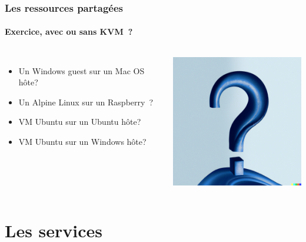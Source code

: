 \documentclass{beamer}
\begin{document}
    \begin{frame}
        \transdissolve
        \frametitle{Les ressources partagées}
        \framesubtitle{Exercice, avec ou sans KVM~?}
        \begin{columns}
            \begin{itemize}
                \item Un Windows guest sur un Mac OS hôte?
                \item Un Alpine Linux sur un Raspberry\footnotemark~?
                \item VM Ubuntu sur un Ubuntu hôte?
                \item VM Ubuntu sur un Windows hôte?
            \end{itemize}
            \centering
            \includegraphics[width=6cm]{image/question-mark-on-a-blank-background}
        \end{columns}
    \end{frame}


    \section{Les services}\label{sec:les-services}
\end{document}
